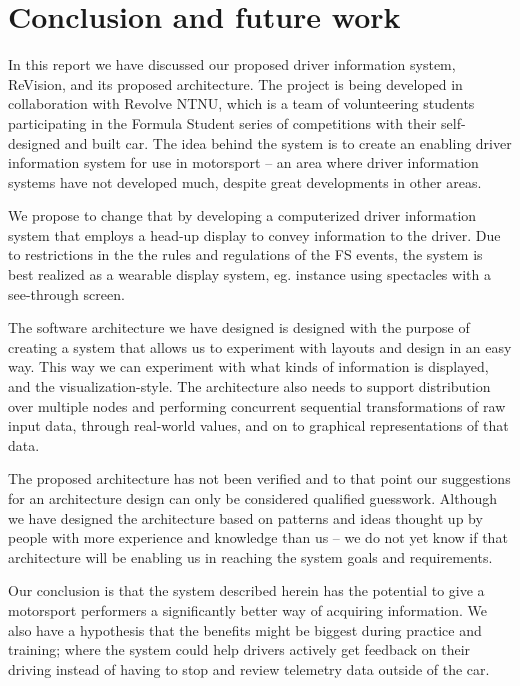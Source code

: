 \chapter{Conclusion and future work}
\label{chapter:conclusion}
	
In this report we have discussed our proposed driver information system,
ReVision, and its proposed architecture. The project is being developed in
collaboration with Revolve NTNU, which is a team of volunteering students
participating in the Formula Student series of competitions with their
self-designed and built car. The idea behind the system is to create an
enabling driver information system for use in motorsport -- an area where
driver information systems have not developed much, despite great developments
in other areas. 

We propose to change that by developing a computerized driver information
system that employs a head-up display to convey information to the driver. Due
to restrictions in the the rules and regulations of the FS events, the system
is best realized as a wearable display system, eg. instance using spectacles with a see-through screen. 

The software architecture we have designed is designed with the purpose of
creating a system that allows us to experiment with layouts and design in an
easy way. This way we can experiment with what kinds of information is
displayed, and the visualization-style. The architecture also
needs to support distribution over multiple nodes and performing concurrent
sequential transformations of raw input data, through real-world values, and on
to graphical representations of that data. 

The proposed architecture has not been verified and to that point our
suggestions for an architecture design can only be considered qualified
guesswork. Although we have designed the architecture based on patterns and ideas thought up by people with more experience and knowledge than us -- we do not yet know if that architecture will be enabling us in reaching the
system goals and requirements. 

Our conclusion is that the system described herein has the potential to give a
motorsport performers a significantly better way of acquiring information. We
also have a hypothesis that the benefits might be biggest during practice and training;
where the system could help drivers actively get feedback on their driving
instead of having to stop and review telemetry data outside of the car. 

